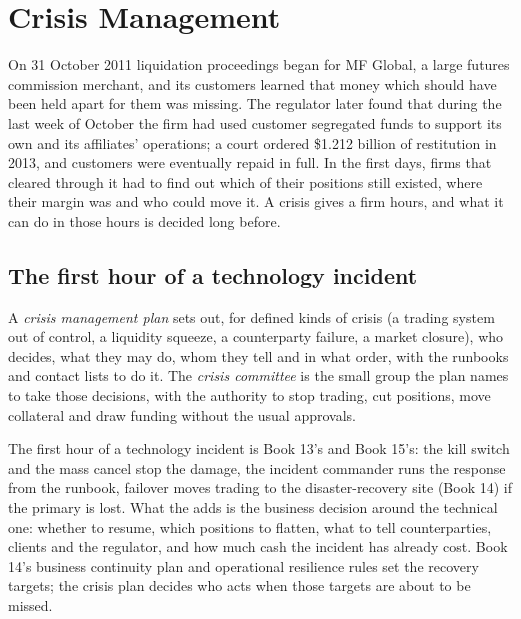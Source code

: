 \chapter{Crisis Management}\label{ch:fm:crisis-management}

On 31 October 2011 liquidation proceedings began for MF Global, a large futures commission merchant, and its customers learned that money which
should have been held apart for them was missing. The regulator later found that during the last week of October the firm had used customer
segregated funds to support its own and its affiliates' operations; a court ordered \$1.212 billion of restitution in 2013, and customers were
eventually repaid in full. In the first days, firms that cleared through it had to find out which of their positions still existed, where their
margin was and who could move it. A crisis gives a firm hours, and what it can do in those hours is decided long before.

\section{The first hour of a technology incident}

\begin{definition}\label{def:fm:crisis-management:plan}
A \emph{crisis management plan} sets out, for defined kinds of crisis (a trading system out of control, a liquidity
squeeze, a counterparty failure, a market closure), who decides, what they may do, whom they tell and in what order, with the runbooks and contact
lists to do it. The \emph{crisis committee} is the small group the plan names to take those decisions, with the authority to
stop trading, cut positions, move collateral and draw funding without the usual approvals.
\end{definition}

The first hour of a technology incident is Book 13's and Book 15's: the kill switch and the mass cancel stop the damage, the incident commander
runs the response from the runbook, failover moves trading to the disaster-recovery site (Book 14) if the primary is lost. What the 
adds is the business decision around the technical one: whether to resume, which positions to flatten, what to tell counterparties, clients and the
regulator, and how much cash the incident has already cost. Book 14's business continuity plan and operational resilience rules set the recovery
targets; the crisis plan decides who acts when those targets are about to be missed.

